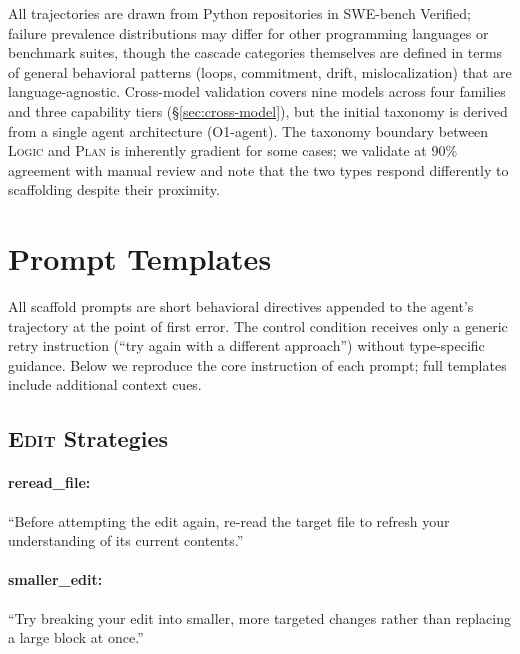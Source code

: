 \documentclass[11pt]{article}
\begin{document}
All trajectories are drawn from Python repositories in SWE-bench Verified; failure prevalence distributions may differ for other programming languages or benchmark suites, though the cascade categories themselves are defined in terms of general behavioral patterns (loops, commitment, drift, mislocalization) that are language-agnostic.
Cross-model validation covers nine models across four families and three capability tiers (\S\ref{sec:cross-model}), but the initial taxonomy is derived from a single agent architecture (O1-agent).
The taxonomy boundary between \textsc{Logic} and \textsc{Plan} is inherently gradient for some cases; we validate at 90\% agreement with manual review and note that the two types respond differently to scaffolding despite their proximity.




\appendix

\section{Prompt Templates}
\label{app:prompts}

All scaffold prompts are short behavioral directives appended to the agent's trajectory at the point of first error. The control condition receives only a generic retry instruction (``try again with a different approach'') without type-specific guidance. Below we reproduce the core instruction of each prompt; full templates include additional context cues.

\subsection{\textsc{Edit} Strategies}

\paragraph{reread\_file:} ``Before attempting the edit again, re-read the target file to refresh your understanding of its current contents.''

\paragraph{smaller\_edit:} ``Try breaking your edit into smaller, more targeted changes rather than replacing a large block at once.''
\end{document}
